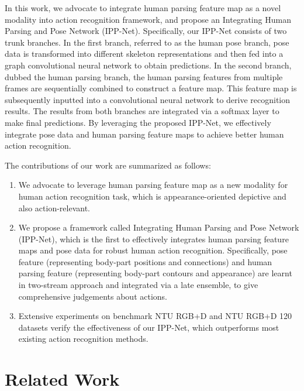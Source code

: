 \documentclass[runningheads]{llncs}
\begin{document}
In this work, we advocate to integrate human parsing feature map as a novel modality into action recognition framework, and propose an Integrating Human Parsing and Pose Network (IPP-Net). Specifically, our IPP-Net consists of two trunk branches. In the first branch, referred to as the human pose branch, pose data is transformed into different skeleton representations and then fed into a graph convolutional neural network to obtain predictions. In the second branch, dubbed the human parsing branch, the human parsing features from multiple frames are sequentially combined to construct a feature map. This feature map is subsequently inputted into a convolutional neural network to derive recognition results. The results from both branches are integrated via a softmax layer to make final predictions. By leveraging the proposed IPP-Net, we effectively integrate pose data and human parsing feature maps to achieve better human action recognition.

The contributions of our work are summarized as follows:
\begin{enumerate}
    \item We advocate to leverage human parsing feature map as a new modality for human action recognition task, which is appearance-oriented depictive and also action-relevant.
    \item We propose a framework called Integrating Human Parsing and Pose Network (IPP-Net), which is the first to effectively integrates human parsing feature maps and pose data for robust human action recognition. Specifically, pose feature (representing body-part positions and connections) and human parsing feature (representing body-part contours and appearance) are learnt in two-stream approach and integrated via a late ensemble, to give comprehensive judgements about actions.
    \item Extensive experiments on benchmark NTU RGB+D and NTU RGB+D 120 datasets verify the effectiveness of our IPP-Net, which outperforms most existing action recognition methods.
\end{enumerate}

\section{Related Work}
\end{document}
